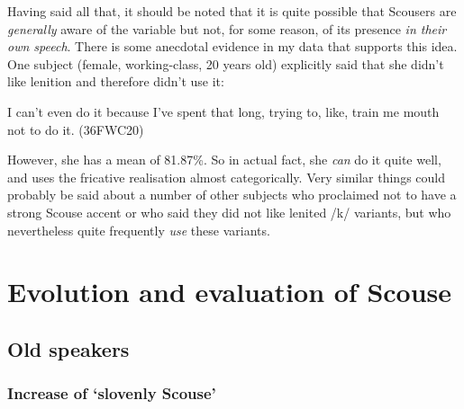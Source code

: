 Having said all that, it should be noted that it is quite possible that Scousers are \emph{generally} aware of the variable but not, for some reason, of its presence \emph{in their own speech}.
There is some anecdotal evidence in my data that supports this idea.
One subject (female, working-class, 20 years old) explicitly said that she didn't like lenition and therefore didn't use it:
\begin{example}
	I can't even do it because I've spent that long, trying to, like, train me mouth not to do it. (36FWC20)
\end{example}
However, she has a mean  of 81.87\%.
So in actual fact, she \emph{can} do it quite well, and uses the fricative realisation almost categorically.
Very similar things could probably be said about a number of other subjects who proclaimed not to have a strong Scouse accent or who said they did not like lenited /k/ variants, but who nevertheless quite frequently \emph{use} these variants.

\section{Evolution and evaluation of Scouse}
\label{aware_res.eval}

\subsection{Old speakers}
\label{aware_res.eval.old}

\subsubsection{Increase of `slovenly Scouse'}
\label{aware_res.eval.old.change}

